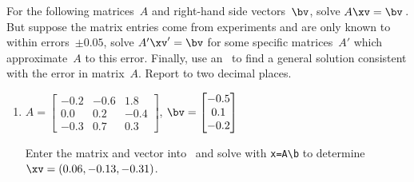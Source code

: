 \begin{example} \label{eg:3regmat}
For the following matrices~\(A\) and right-hand side vectors~\(\bv\),
solve \(A\xv=\bv\)\,.
But suppose the matrix entries come from experiments and are only known to within errors~\(\pm0.05\),  solve \(A'\xv'=\bv\) for some specific matrices~\(A'\) which approximate~\(A\) to this error.
Finally, use an \svd\ to find a general solution consistent with the error in matrix~\(A\).
Report to two decimal places.
\begin{enumerate}
\item\label{eg:3regmata} \(A=\begin{bmatrix} -0.2&-0.6&1.8
\\ 0.0&0.2&-0.4
\\ -0.3&0.7&0.3 \end{bmatrix}\),
\(\bv=\begin{bmatrix} -0.5
\\ 0.1
\\ -0.2
 \end{bmatrix}\)
\begin{solution} 
Enter the matrix and vector into \script\ and solve with \verb|x=A\b| to determine \(\xv=(0.06,-0.13,-0.31)\).
\setbox\ajrqrbox\hbox{}%
\marginpar{\usebox{\ajrqrbox\\[2ex]}}%


\end{solution}
\end{enumerate}
\end{example}
